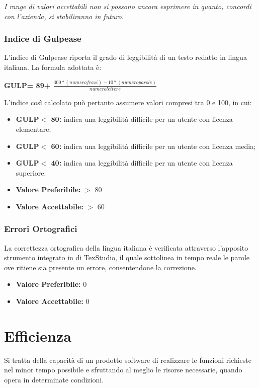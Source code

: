 \textit{I range di valori accettabili non si possono ancora esprimere in quanto, concordi con l'azienda, si stabiliranno in futuro.}
\subsubsection{Indice di Gulpease} \label{3.3.1.2}
L’indice di Gulpease riporta il grado di leggibilità di un testo redatto in lingua italiana.
La formula adottata è:
\begin{center}
	\textbf{GULP= 89+ $\frac{300*(numero frasi)-10*(numero parole)}{numero lettere}$}
\end{center}
L'indice così calcolato può pertanto assumere valori compresi tra 0 e 100, in cui:
\begin{itemize}
	\item \textbf{GULP$<$ 80:} indica una leggibilità difficile per un utente con licenza elementare;
	\item \textbf{GULP$<$ 60:} indica una leggibilità difficile per un utente con licenza media;
	\item \textbf{GULP$<$ 40:} indica una leggibilità difficile per un utente con licenza superiore.
\end{itemize}
\begin{itemize}
	\item \textbf{Valore Preferibile:} $>$ 80 
	\item \textbf{Valore  Accettabile:} $>$ 60
\end{itemize}
\subsubsection{Errori Ortografici} \label{3.3.1.3}
La correttezza ortografica della lingua italiana è verificata attraverso l’apposito strumento integrato in di TexStudio, il quale sottolinea in tempo reale le parole ove ritiene sia presente un errore, consentendone la correzione.
\begin{itemize}
	\item \textbf{Valore Preferibile:} 0
	\item \textbf{Valore  Accettabile:} 0
\end{itemize}

\section{Efficienza} \label{3.4}
Si tratta della capacità di un prodotto software di realizzare le funzioni richieste nel minor tempo possibile e sfruttando al meglio le risorse necessarie, quando opera in determinate condizioni. 
